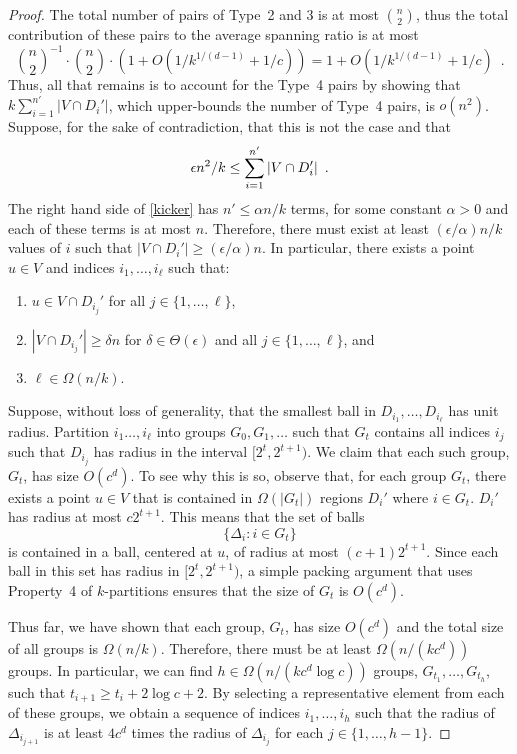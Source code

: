 \documentclass{patmorin}
\begin{document}
\begin{proof}
  The total number of pairs of Type~2 and 3 is at most $\binom{n}{2}$,
  thus the total contribution of these pairs to the average spanning ratio
  is at most
  \[
    \binom{n}{2}^{-1}\cdot\binom{n}{2}\cdot(1+O(1/k^{1/(d-1)}+1/c)) = 1+O(1/k^{1/(d-1)}+1/c) \enspace .
  \]
  Thus, all that remains is to account for the Type~4 pairs by showing
  that $k\sum_{i=1}^{n'}|V\cap D_i'|$, which upper-bounds the number of
  Type~4 pairs, is $o(n^2)$.  Suppose, for the sake of contradiction,
  that this is not the case and that
  \begin{equation}
    \epsilon n^2/k \le \sum_{i=1}^{n'} |V\cap D_i'| 
         \enspace . \eqlabel{kicker}
  \end{equation}
  The right hand side of \eqref{kicker} has $n'\le \alpha n/k$
  terms, for some constant $\alpha >0$ and each of these terms
  is at most $n$.  Therefore, there must exist at least
  $(\epsilon/\alpha)n/k$ values of $i$ such that $|V\cap D_i'|\ge
  (\epsilon/\alpha)n$.  In particular, there exists a point $u\in V$
  and indices $i_1,\ldots,i_\ell$ such that:
  \begin{enumerate}
     \item $u\in V\cap D_{i_j}'$ for all $j\in\{1,\ldots,\ell\}$,
     \item $|V\cap D_{i_j}'|\ge \delta n$ for $\delta\in\Theta(\epsilon)$
       and all $j\in\{1,\ldots,\ell\}$, and
     \item $\ell\in\Omega(n/k)$.
  \end{enumerate}

  Suppose, without loss of generality, that the smallest ball
  in $D_{i_1},\ldots,D_{i_\ell}$ has unit radius.  Partition
  $i_1\ldots,i_\ell$ into groups $G_0,G_1,\ldots$ such that $G_t$
  contains all indices $i_j$ such that $D_{i_j}$ has radius in the
  interval $[2^t,2^{t+1})$.
  We claim that each such group, $G_t$, has size $O(c^d)$.  To see
  why this is so, observe that, for each group $G_t$, there exists a
  point $u\in V$ that is contained in $\Omega(|G_t|)$ regions $D_{i}'$
  where $i\in G_t$.  $D_{i}'$ has radius at most $c2^{t+1}$.  This means
  that the set of balls
  \[
     \{ \Delta_i : i\in G_t\}
  \]
  is contained in a ball, centered at $u$, of radius at most
  $(c+1)2^{t+1}$.  Since each ball in this set has radius in
  $[2^t,2^{t+1})$, a simple packing argument that uses Property~4 of
  $k$-partitions ensures that the size of $G_t$ is $O(c^d)$.

  Thus far, we have shown that each group, $G_t$, has size $O(c^d)$
  and the total size of all groups is $\Omega(n/k)$.
  Therefore, there must be at least $\Omega(n/(kc^d))$ groups.
  In particular, we can find $h\in\Omega(n/(kc^d\log c))$ groups,
  $G_{t_1},\ldots,G_{t_h}$, such that $t_{i+1} \ge
  t_{i}+2\log c+2$.  By selecting a representative element from each
  of these groups, we obtain a sequence of indices $i_1,\ldots,i_h$
  such that the radius of $\Delta_{i_{j+1}}$ is at least $4c^d$ times the
  radius of $\Delta_{i_j}$ for each $j\in\{1,\ldots,h-1\}$.


\end{proof}
\end{document}
